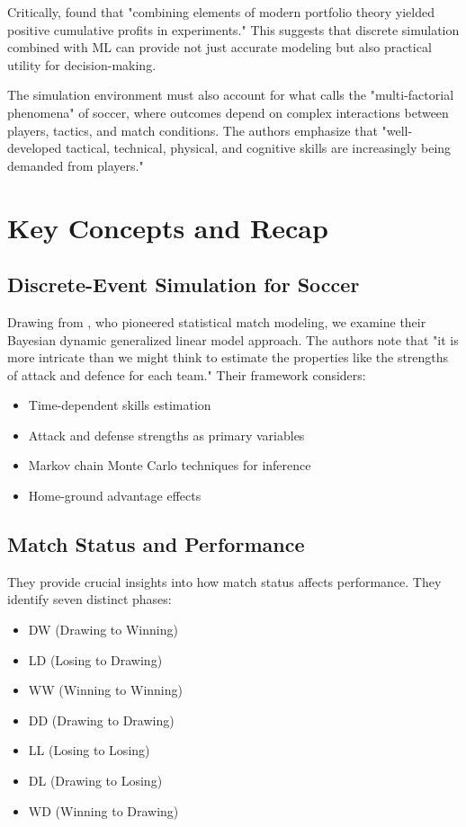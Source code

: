 \documentclass[10pt,journal,compsoc]{IEEEtran}
\begin{document}
Critically, \cite{wong2025predictive} found that "combining elements of modern portfolio theory yielded positive cumulative profits in experiments." This suggests that discrete simulation combined with ML can provide not just accurate modeling but also practical utility for decision-making.

The simulation environment must also account for what \cite{nassis2023review} calls the "multi-factorial phenomena" of soccer, where outcomes depend on complex interactions between players, tactics, and match conditions. The authors emphasize that "well-developed tactical, technical, physical, and cognitive skills are increasingly being demanded from players."

\section{Key Concepts and Recap}

\subsection{Discrete-Event Simulation for Soccer}
Drawing from \cite{rue2000prediction}, who pioneered statistical match modeling, we examine their Bayesian dynamic generalized linear model approach. The authors note that "it is more intricate than we might think to estimate the properties like the strengths of attack and defence for each team." Their framework considers:
\begin{itemize}
    \item Time-dependent skills estimation
    \item Attack and defense strengths as primary variables
    \item Markov chain Monte Carlo techniques for inference
    \item Home-ground advantage effects
\end{itemize}

\subsection{Match Status and Performance}
\cite{konefal2023seven} They provide crucial insights into how match status affects performance. They identify seven distinct phases:
\begin{itemize}
    \item DW (Drawing to Winning)
    \item LD (Losing to Drawing) 
    \item WW (Winning to Winning)
    \item DD (Drawing to Drawing)
    \item LL (Losing to Losing)
    \item DL (Drawing to Losing)
    \item WD (Winning to Drawing)
\end{itemize}
\end{document}
